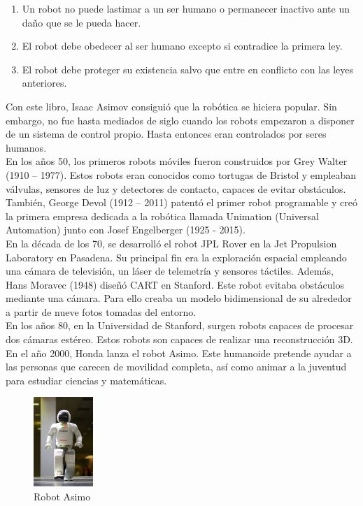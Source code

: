 \begin{enumerate}[1.]
    \item Un robot no puede lastimar a un ser humano o permanecer inactivo ante un daño que se le pueda hacer.
    \item El robot debe obedecer al ser humano excepto si contradice la primera ley.
    \item El robot debe proteger su existencia salvo que entre en conflicto con las leyes anteriores.
\end{enumerate}

Con este libro, Isaac Asimov consiguió que la robótica se hiciera popular. Sin embargo, no fue hasta mediados de siglo cuando los robots empezaron a disponer de un sistema de control propio. Hasta entonces eran controlados por seres humanos. \\

En los años 50, los primeros robots móviles fueron construidos por Grey Walter (1910 – 1977). Estos robots eran conocidos como tortugas de Bristol y empleaban válvulas, sensores de luz y detectores de contacto, capaces de evitar obstáculos. También, George Devol (1912 – 2011) patentó el primer robot programable y creó la primera empresa dedicada a la robótica llamada Unimation (Universal Automation) junto con Josef Engelberger (1925 - 2015). \\

En la década de los 70, se desarrolló el robot JPL Rover en la Jet Propulsion Laboratory en Pasadena. Su principal fin era la exploración espacial empleando una cámara de televisión, un láser de telemetría y sensores táctiles. Además, Hans Moravec (1948) diseñó CART en Stanford. Este robot evitaba obstáculos mediante una cámara. Para ello creaba un modelo bidimensional de su alrededor a partir de nueve fotos tomadas del entorno. \\

En los años 80, en la Universidad de Stanford, surgen robots capaces de procesar dos cámaras estéreo. Estos robots son capaces de realizar una reconstrucción 3D. 
En el año 2000, Honda lanza el robot Asimo. Este humanoide pretende ayudar a las personas que carecen de movilidad completa, así como animar a la juventud para estudiar ciencias y matemáticas.\\

\begin{figure}[H]
  \begin{center}
    \includegraphics[width=0.2\textwidth]{figures/Introduccion/asimo.png}
		\caption{Robot Asimo}
		\label{fig.asimo}
		\end{center}
\end{figure}

